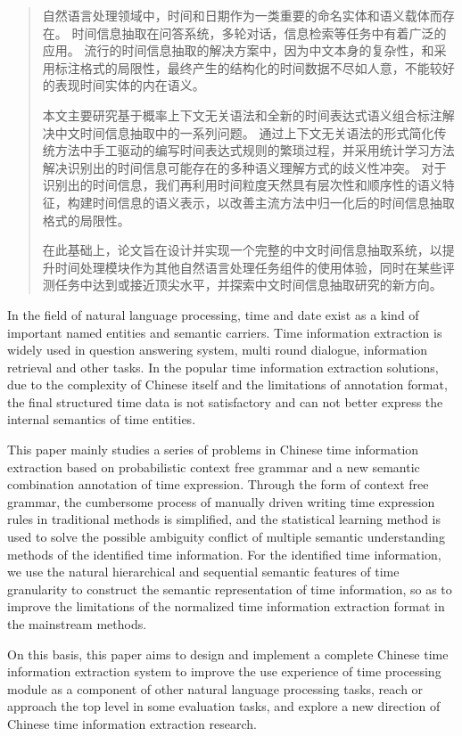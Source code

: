 

\begin{abstract}
  自然语言处理领域中，时间和日期作为一类重要的命名实体和语义载体而存在。
  时间信息抽取在问答系统，多轮对话，信息检索等任务中有着广泛的应用。
  流行的时间信息抽取的解决方案中，因为中文本身的复杂性，和采用标注格式的局限性，最终产生的结构化的时间数据不尽如人意，不能较好的表现时间实体的内在语义。

  本文主要研究基于概率上下文无关语法和全新的时间表达式语义组合标注解决中文时间信息抽取中的一系列问题。
  通过上下文无关语法的形式简化传统方法中手工驱动的编写时间表达式规则的繁琐过程，并采用统计学习方法解决识别出的时间信息可能存在的多种语义理解方式的歧义性冲突。
  对于识别出的时间信息，我们再利用时间粒度天然具有层次性和顺序性的语义特征，构建时间信息的语义表示，以改善主流方法中归一化后的时间信息抽取格式的局限性。

  在此基础上，论文旨在设计并实现一个完整的中文时间信息抽取系统，以提升时间处理模块作为其他自然语言处理任务组件的使用体验，同时在某些评测任务中达到或接近顶尖水平，并探索中文时间信息抽取研究的新方向。
\end{abstract}

\begin{abstract*}
  In the field of natural language processing, time and date exist as a kind of important named entities and semantic carriers.
  Time information extraction is widely used in question answering system, multi round dialogue, information retrieval and other tasks.
  In the popular time information extraction solutions, due to the complexity of Chinese itself and the limitations of annotation format, the final structured time data is not satisfactory and can not better express the internal semantics of time entities.

  This paper mainly studies a series of problems in Chinese time information extraction based on probabilistic context free grammar and a new semantic combination annotation of time expression.
  Through the form of context free grammar, the cumbersome process of manually driven writing time expression rules in traditional methods is simplified, and the statistical learning method is used to solve the possible ambiguity conflict of multiple semantic understanding methods of the identified time information.
  For the identified time information, we use the natural hierarchical and sequential semantic features of time granularity to construct the semantic representation of time information, so as to improve the limitations of the normalized time information extraction format in the mainstream methods.

  On this basis, this paper aims to design and implement a complete Chinese time information extraction system to improve the use experience of time processing module as a component of other natural language processing tasks, reach or approach the top level in some evaluation tasks, and explore a new direction of Chinese time information extraction research.
\end{abstract*}
